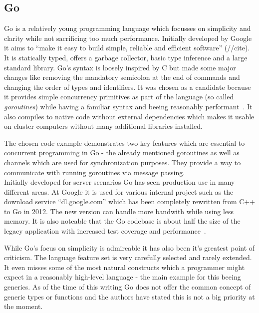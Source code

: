 \subsection*{Go}
\label{subsec:State_of_the_art::Candidates::Go}

Go is a relatively young programming language which focusses on simplicity and clarity while not sacrificing too much performance. Initially developed by Google it aims to ``make it easy to build simple, reliable and efficient software'' (//cite). It is statically typed, offers a garbage collector, basic type inference and a large standard library. Go's syntax is loosely inspired by C but made some major changes like removing the mandatory semicolon at the end of commands and changing the order of types and identifiers. It was chosen as a candidate because it provides simple concurrency primitives as part of the language (so called \textit{goroutines}) while having a familiar syntax and beeing reasonably performant~\cite{intro_go}. It also compiles to native code without external dependencies which makes it usable on cluster computers without many additional libraries installed.

The chosen code example demonstrates two key features which are essential to concurrent programming in Go - the already mentioned goroutines as well as channels which are used for synchronization purposes. They provide a way to communicate with running goroutines via message passing.
\\


Initially developed for server scenarios Go has seen production use in many different areas. At Google it is used for various internal project such as the download service ``dl.google.com'' which has been completely rewritten from C++ to Go in 2012. The new version can handle more bandwith while using less memory. It is also noteable that the Go codebase is about half the size of the legacy application with increased test coverage and performance~\cite{go_dl_google}.

While Go's focus on simplicity is admireable it has also been it's greatest point of criticism. The language feature set is very carefully selected and rarely extended. It even misses some of the most natural constructs which a programmer might expect in a reasonably high-level language - the main example for this beeing generics. As of the time of this writing Go does not offer the common concept of generic types or functions and the authors have stated this is not a big priority at the moment.

